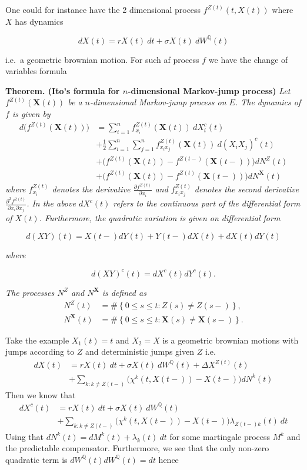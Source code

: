 \documentclass[
]{book}
\begin{document}
One could for instance have the 2 dimensional process \(f^{Z(t)}(t,X(t))\) where \(X\) has dynamics

\[
dX(t)=rX(t)\ dt + \sigma X(t)\ dW^\mathbb Q(t)
\]

i.e.~a geometric brownian motion. For such af process \(f\) we have the change of variables formula

\textbf{Theorem. (Ito's formula for \(n\)-dimensional Markov-jump process)} \emph{Let \(f^{Z(t)}(\mathbf X(t))\) be a \(n\)-dimensional Markov-jump process on \(E\). The dynamics of \(f\) is given by}
\begin{align*}
d \Big(f^{Z(t)}(\mathbf X(t))\Big)&=\sum_{i=1}^n f_{x_i}^{Z(t)}(\mathbf X(t))\ dX_i^c(t)\\
&+\frac{1}{2}\sum_{i=1}^n\sum_{j=1}^n f_{x_ix_j}^{Z(t)}(\mathbf X(t))\ d(X_iX_j)^c(t)\\
&+\Big(f^{Z(t)}(\mathbf X(t))-f^{Z(t-)}(\mathbf X(t-))\Big)dN^Z(t)\\
&+\Big(f^{Z(t)}(\mathbf X(t))-f^{Z(t)}(\mathbf X(t-))\Big)dN^\mathbf X(t)
\end{align*}
\emph{where \(f^{Z(t)}_{x_i}\) denotes the derivative \(\frac{\partial f^{Z(t)}}{\partial x_i}\) and \(f^{Z(t)}_{x_ix_j}\) denotes the second derivative \(\frac{\partial^2 f^{Z(t)}}{\partial x_i\partial x_j}\). In the above \(dX^c(t)\) refers to the continuous part of the differential form of \(X(t)\). Furthermore, the quadratic variation is given on differential form}

\[
d(XY)(t)=X(t-)dY(t)+Y(t-)dX(t)+dX(t)dY(t)
\]

\emph{where}

\[
d(XY)^c(t)=dX^c(t)dY^c(t).
\]

\emph{The processes \(N^Z\) and \(N^\mathbf X\) is defined as}
\begin{align*}
N^Z(t)&=\#\left\{ 0\le s\le t: Z(s)\ne Z(s-) \right\},\\
N^\mathbf X(t)&=\#\left\{ 0\le s\le t: \mathbf X(s)\ne \mathbf X(s-) \right\}.
\end{align*}

Take the example \(X_1(t)=t\) and \(X_2=X\) is a geometric brownian motions with jumps according to \(Z\) and deterministic jumps given \(Z\) i.e.
\begin{align*}
dX(t)&=rX(t)\ dt+\sigma X(t)\ dW^\mathbb Q(t)+\Delta X^{Z(t)}(t)\\
&+\sum_{k:k\ne Z(t-)}\Big(\chi^k(t,X(t-))-X(t-)\Big)dN^{k}(t)
\end{align*}
Then we know that
\begin{align*}
dX^c(t)&=rX(t)\ dt+\sigma X(t)\ dW^\mathbb Q(t)\\
&+\sum_{k:k\ne Z(t-)}\Big(\chi^k(t,X(t-))-X(t-)\Big)\lambda_{Z(t-)k}(t)\ dt
\end{align*}
Using that \(dN^k(t)=dM^k(t)+\lambda_k(t)\ dt\) for some martingale process \(M^k\) and the predictable compensator. Furthermore, we see that the only non-zero quadratic term is \(dW^\mathbb Q(t)dW^\mathbb Q(t)=dt\) hence
\end{document}
